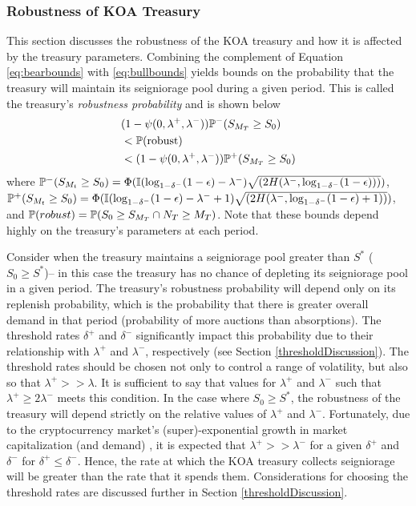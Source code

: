 \subsubsection{Robustness of KOA Treasury}

This section discusses the robustness of the KOA treasury and how it is affected by the treasury parameters. Combining the complement of Equation \ref{eq:bearbounds} with \ref{eq:bullbounds} yields bounds on the probability that the treasury will maintain its seigniorage pool during a given period. This is called the treasury's \textit{robustness probability} and is shown below
%
\begin{equation} \label{eq:robustbounds}
\begin{aligned}
& (1-\psi(0, \lambda^+, \lambda^-)) \mathbb{P}^-(S_{M_T} \geq S_0) \\
& < \mathbb{P}(\text{robust}) \\
& < (1-\psi(0, \lambda^+, \lambda^-)) \mathbb{P}^+(S_{M_T} \geq S_0)
\end{aligned}
\end{equation}
%
where $\mathbb{P}^-(S_{M_t} \geq S_0) = \Phi (\mathbb{I}(\log_{1- \delta^-}(1-\epsilon) - \lambda^-) \sqrt{(2H(\lambda^-, \log_{1- \delta^-}(1-\epsilon)))})$, $\mathbb{P}^+(S_{M_t} \geq S_0) = \Phi (\mathbb{I}(\log_{1- \delta^-}(1-\epsilon) - \lambda^- +1) \sqrt{(2H(\lambda^-, \log_{1- \delta^-}(1-\epsilon) +1))})$, and $\mathbb{P}(robust) = \mathbb{P}(S_0 \geq S_{M_T} \cap N_T \geq M_T)$. Note that these bounds depend highly on the treasury's parameters at each period. 

Consider when the treasury maintains a seigniorage pool greater than $S^*$ (\ie\ $S_0 \geq S^*$)-- in this case the treasury has no chance of depleting its seigniorage pool in a given period. The treasury's robustness probability will depend only on its replenish probability, which is the probability that there is greater overall demand in that period (probability of more auctions than absorptions). The threshold rates $\delta^+$ and $\delta^-$ significantly impact this probability due to their relationship with $\lambda^+$ and $\lambda^-$, respectively (see Section \ref{thresholdDiscussion}). The threshold rates should be chosen not only to control a range of volatility, but also so that $\lambda^+ >> \lambda$. It is sufficient to say that values for $\lambda^+$ and $\lambda^-$ such that $\lambda^+ \geq 2 \lambda^-$ meets this condition. In the case where $S_0 \geq S^*$, the robustness of the treasury will depend strictly on the relative values of $\lambda^+$ and $\lambda^-$. Fortunately, due to the cryptocurrency market's (super)-exponential growth in market capitalization (and demand) \cite{ElBahrawy17}, it is expected that $\lambda^+ >> \lambda^-$ for a given $\delta^+$ and $\delta^-$ for $\delta^+ \leq \delta^-$. Hence, the rate at which the KOA treasury collects seigniorage will be greater than the rate that it spends them. Considerations for choosing the threshold rates are discussed further in Section \ref{thresholdDiscussion}.

